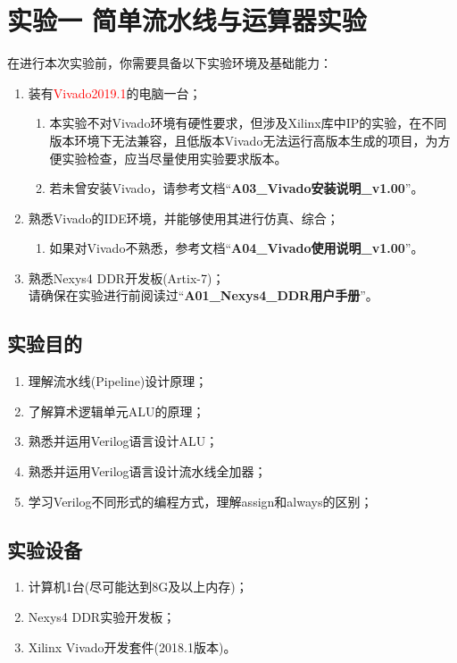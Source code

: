 \section{实验一 \quad 简单流水线与运算器实验}
在进行本次实验前，你需要具备以下实验环境及基础能力：
\begin{enumerate}
    \item 装有\textcolor{red}{Vivado2019.1}的电脑一台；
    \begin{enumerate}
        \item 本实验不对Vivado环境有硬性要求，但涉及Xilinx库中IP的实验，在不同版本环境下无法兼容，且低版本Vivado无法运行高版本生成的项目，为方便实验检查，应当尽量使用实验要求版本。
        \item 若未曾安装Vivado，请参考文档“\textbf{A03\_Vivado安装说明\_v1.00}”。
    \end{enumerate}
    \item 熟悉Vivado的IDE环境，并能够使用其进行仿真、综合；
    \begin{enumerate}
        \item 如果对Vivado不熟悉，参考文档“\textbf{A04\_Vivado使用说明\_v1.00}”。
    \end{enumerate}
    \item 熟悉Nexys4 DDR开发板(Artix-7)；
    \\ 请确保在实验进行前阅读过“\textbf{A01\_Nexys4\_DDR用户手册}”。

\end{enumerate}

\subsection{实验目的}

\begin{enumerate}
    \item 理解流水线(Pipeline)设计原理；
    \item 了解算术逻辑单元ALU的原理；
    \item 熟悉并运用Verilog语言设计ALU；
    \item 熟悉并运用Verilog语言设计流水线全加器；
    \item 学习Verilog不同形式的编程方式，理解assign和always的区别；
\end{enumerate}
\subsection{实验设备}
\begin{enumerate}
    \item 计算机1台(尽可能达到8G及以上内存)；
    \item Nexys4 DDR实验开发板；
    \item Xilinx Vivado开发套件(2018.1版本)。

\end{enumerate}

